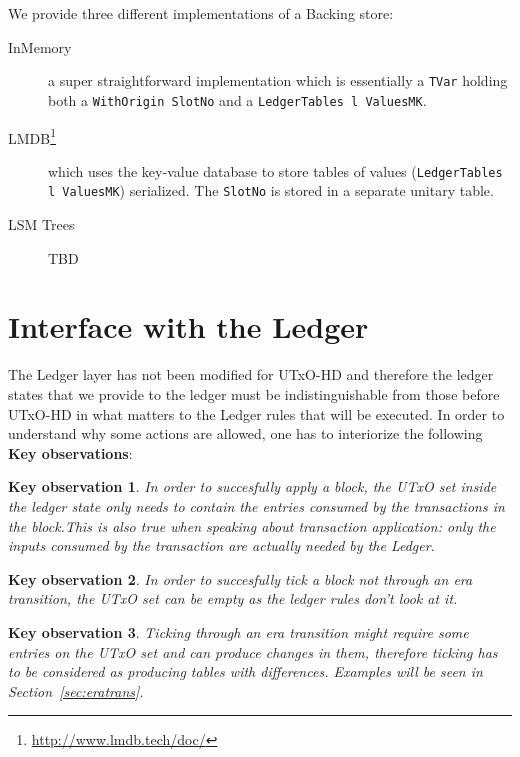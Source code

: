 \documentclass[11pt,a4paper]{article}
\newcommand{\htt}[1]{\texttt{#1}}
\theoremstyle{definition}
\newtheorem{observation}{Key observation}
\begin{document}
We provide three different implementations of a Backing store:

\begin{description}
  \item[InMemory] a super straightforward implementation which is
        essentially a \htt{TVar} holding both a \htt{WithOrigin SlotNo}
        and a \htt{LedgerTables l ValuesMK}.

  \item[LMDB\footnote{\href{http://www.lmdb.tech/doc/}{http://www.lmdb.tech/doc/}}] which uses the
        key-value database to store tables of values (\htt{LedgerTables
        l ValuesMK}) serialized. The \htt{SlotNo} is stored in a
        separate unitary table.

  \item[LSM Trees] TBD

\end{description}

\section{Interface with the Ledger}

The Ledger layer has not been modified for UTxO-HD and therefore the ledger
states that we provide to the ledger must be indistinguishable from those before
UTxO-HD in what matters to the Ledger rules that will be executed. In order to
understand why some actions are allowed, one has to interiorize the following
\textbf{Key observations}:

\begin{observation}
  \emph{In order to succesfully apply a block, the UTxO set inside the ledger state
  only needs to contain the entries consumed by the transactions in the block.This is also true when speaking about transaction application: only the inputs
  consumed by the transaction are actually needed by the Ledger.}
\end{observation}

\begin{observation}
  \emph{In order to succesfully tick a block not through an era transition, the
    UTxO set can be empty as the ledger rules don't look at it.}
\end{observation}

\begin{observation}
  \emph{Ticking through an era transition might require some entries on the UTxO
    set and can produce changes in them, therefore ticking has to be considered
    as producing tables with differences. Examples will be seen in
    Section~\ref{sec:eratrans}. }
\end{observation}
\end{document}
